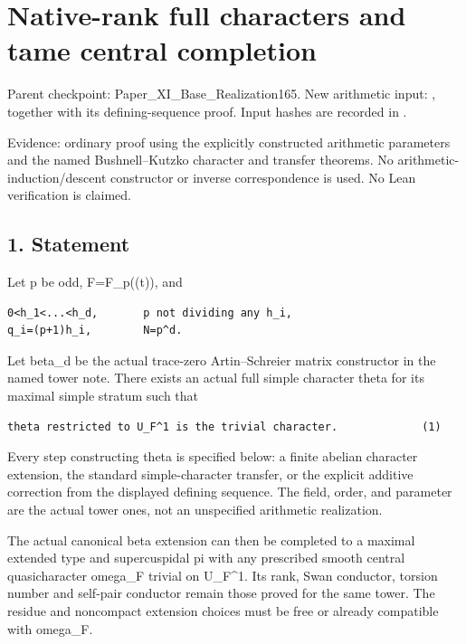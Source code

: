 \clearpage
\section{Native-rank full characters and tame central completion}\label{app:odd_character}

Parent checkpoint: Paper\_XI\_Base\_Realization165. New arithmetic
input: ,
together with its  defining-sequence
proof. Input hashes are recorded in
.

Evidence: ordinary proof using the explicitly constructed arithmetic
parameters and the named Bushnell--Kutzko character and transfer
theorems. No arithmetic-induction/descent constructor or inverse
correspondence is used. No Lean verification is claimed.

\hypertarget{odd_character-statement}{%
\subsection{1. Statement}\label{odd_character-statement}}

Let p be odd, F=F\_p((t)), and

\begin{Verbatim}[fontsize=\small,breaklines=true,breakanywhere=true]
0<h_1<...<h_d,       p not dividing any h_i,
q_i=(p+1)h_i,        N=p^d.
\end{Verbatim}

Let beta\_d be the actual trace-zero Artin--Schreier matrix constructor
in the named tower note. There exists an actual full simple character
theta for its maximal simple stratum such that

\begin{Verbatim}[fontsize=\small,breaklines=true,breakanywhere=true]
theta restricted to U_F^1 is the trivial character.             (1)
\end{Verbatim}

Every step constructing theta is specified below: a finite abelian
character extension, the standard simple-character transfer, or the
explicit additive correction from the displayed defining sequence. The
field, order, and parameter are the actual tower ones, not an
unspecified arithmetic realization.

The actual canonical beta extension can then be completed to a maximal
extended type and supercuspidal pi with any prescribed smooth central
quasicharacter omega\_F trivial on U\_F\^{}1. Its rank, Swan conductor,
torsion number and self-pair conductor remain those proved for the same
tower. The residue and noncompact extension choices must be free or
already compatible with omega\_F.

